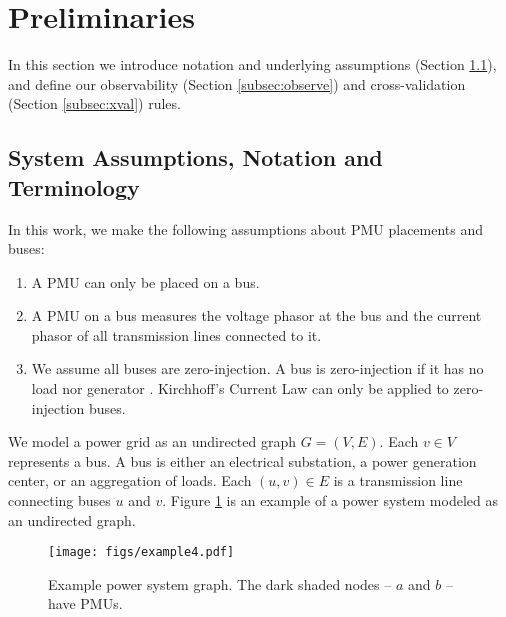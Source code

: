 \section{Preliminaries}
\label{sec:prelim}

In this section we introduce notation and underlying assumptions (Section \ref{subsec:notation-assume}), 
and define our observability (Section \ref{subsec:observe}) and cross-validation (Section \ref{subsec:xval}) rules.


\subsection{System Assumptions, Notation and Terminology}
\label{subsec:notation-assume}

In this work, we make the following assumptions about PMU placements and buses:
\begin{enumerate}
	\item A PMU can only be placed on a bus.
	\item A PMU on a bus measures the voltage phasor at the bus and the current phasor of all transmission lines connected to it. 
	\item We assume all buses are zero-injection. A bus is zero-injection if it has no load nor generator \cite{Zhang10}.  Kirchhoff's Current Law can only be applied to zero-injection buses.
\end{enumerate}

We model a power grid as an undirected graph $G=(V,E)$.  Each $v \in V$ represents a bus.  A bus is either an electrical substation, a power generation center, or an 
aggregation of loads. Each $(u,v) \in E$ is a transmission line connecting buses $u$ and $v$.  Figure \ref{fig:example} is an example of a power system modeled as an undirected graph.

\begin{figure}[t]
\centering
\texttt{[image: figs/example4.pdf]}
\caption{Example power system graph. The dark shaded nodes -- $a$ and $b$ -- have PMUs.} 
\label{fig:example}
\end{figure}

